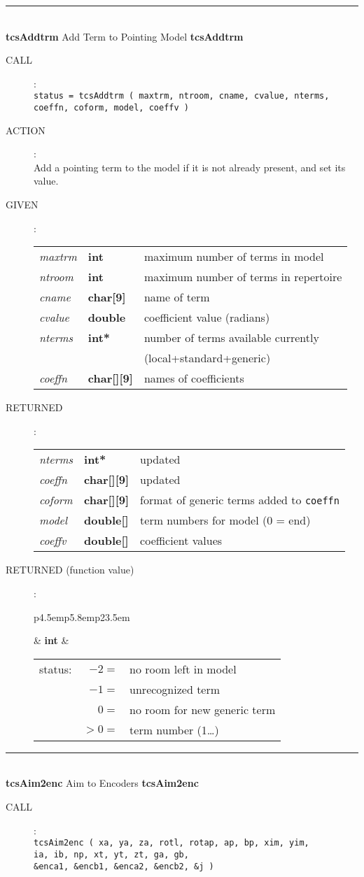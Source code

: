 \documentclass[12pt,fleqn,twoside]{article}
\renewcommand{\_}{{\tt\char'137}}     %
\newcommand{\routine}[2]
{
  \newpage
  \rule{\textwidth}{0.3mm}\\ \nopagebreak
  {\Large {\bf #1} \hfill #2 \hfill {\bf #1}}
  \vspace{-1ex}
}
\newcommand{\call}[1]
{
  \goodbreak
  \begin{description}
    \item[CALL]: \\[0.5ex] \nopagebreak
        {\tt #1}
  \end{description}
  \vspace{-3ex}
}
\newcommand{\action}[1]
{
  \goodbreak
  \begin{description}
    \item[ACTION]: \\[0.5ex] \nopagebreak
        #1
  \end{description}
  \vspace{-3ex}
}
\newcommand{\args}[2]
{
  \goodbreak
  \begin{description}
  \item[#1]: \\[1.5ex] \nopagebreak
    \hspace*{-0.9em}
    \begin{tabular}{p{4.5em}p{5.8em}p{23.5em}}
      #2
    \end{tabular}
  \end{description}
  \vspace{-3ex}
}
\newcommand{\spec}[3]
{
  {\em {#1}} & {\bf \mbox{#2}} & {#3}
}
\begin{document}
\routine{tcsAddtrm}{Add Term to Pointing Model}
\label{tcsAddtrm}
\call{status = tcsAddtrm ( maxtrm, ntroom, cname, cvalue, nterms, \\
             \hspace*{10em} coeffn, coform, model, coeffv )}
\action{Add a pointing term to the model if it is not already present,
        and set its value.}
\args{GIVEN}
{
\spec{maxtrm}{int}{maximum number of terms in model} \\
\spec{ntroom}{int}{maximum number of terms in repertoire} \\
\spec{cname }{char[9]}{name of term} \\
\spec{cvalue}{double}{coefficient value (radians)} \\
\spec{nterms}{int*}{number of terms available currently} \\
\spec{}{}{\hfill (local+standard+generic)} \\
\spec{coeffn}{char[][9]}{names of coefficients}
}
\args{RETURNED}{
\spec{nterms}{int*}{updated} \\
\spec{coeffn}{char[][9]}{updated} \\
\spec{coform}{char[][9]}{format of generic terms
                                               added to {\tt coeffn}} \\
\spec{model}{double[]}{term numbers for model (0 = end)} \\
\spec{coeffv}{double[]}{coefficient values}
}
\args{RETURNED \rm (function value)}
{
\spec{}{int}{\hspace{-1.8ex}
             \begin{tabular}[t]{lrl}
               status: & $ -2 = $ & no room left in model \\
                       & $ -1 = $ & unrecognized term \\
                       & $  0 = $ & no room for new generic term \\
                       & $ >0 = $ & term number (1\ldots) \\
             \end{tabular}
            }
}
\routine{tcsAim2enc}{{\sc Aim} to Encoders}
\label{tcsAim2enc}
\call{tcsAim2enc ( xa, ya, za, rotl, rotap, ap, bp, xim, yim, \\
     \hspace*{6em} ia, ib, np, xt, yt, zt, ga, gb, \\
     \hspace*{6em} \&enca1, \&encb1, \&enca2, \&encb2, \&j )}
\end{document}
